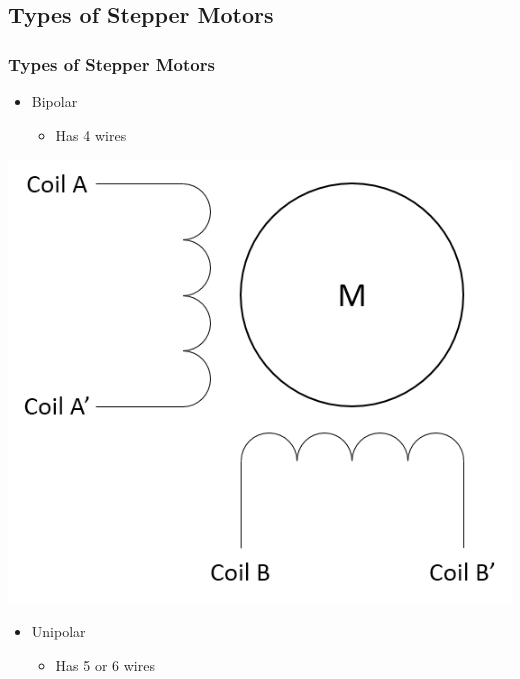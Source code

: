 \documentclass[table,10pt,red]{beamer}	%
\begin{document}
\subsection{Types of Stepper Motors}
\begin{frame}
	\frametitle{Types of Stepper Motors}
	\pause
	\begin{minipage}[c]{0.45\textwidth}
	\begin{itemize}
		\item Bipolar
			\begin{itemize}
				\item Has 4 wires
				
			\end{itemize}
	\end{itemize}
	\includegraphics[width=\linewidth]{Bipolar}
	\end{minipage}
	\pause
	\begin{minipage}[c]{0.45\textwidth}
		\begin{itemize}
			\item Unipolar
				\begin{itemize}
					\item Has 5 or 6 wires
					

\end{itemize}
\end{itemize}
\end{minipage}
\end{frame}
\end{document}
